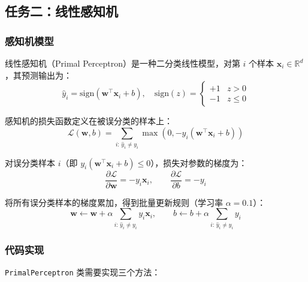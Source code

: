 \documentclass[12pt,a4paper]{ctexart}
\begin{document}
\subsection{任务二：线性感知机}

\subsubsection{感知机模型}

线性感知机（Primal Perceptron）是一种二分类线性模型，对第 $i$ 个样本 $\mathbf{x}_i \in \mathbb{R}^d$，其预测输出为：
\begin{equation}
  \hat{y}_i = \text{sign}(\mathbf{w}^\top \mathbf{x}_i + b), \quad \text{sign}(z) = \begin{cases} +1 & z > 0 \\ -1 & z \leq 0 \end{cases}
  \label{eq:perceptron}
\end{equation}

感知机的损失函数定义在被误分类的样本上：
\begin{equation}
  \mathcal{L}(\mathbf{w}, b) = \sum_{i:\, \hat{y}_i \neq y_i} \max(0, -y_i(\mathbf{w}^\top \mathbf{x}_i + b))
  \label{eq:perceptron_loss}
\end{equation}

对误分类样本 $i$（即 $y_i(\mathbf{w}^\top \mathbf{x}_i + b) \leq 0$），损失对参数的梯度为：
\begin{equation}
  \frac{\partial \mathcal{L}}{\partial \mathbf{w}} = -y_i \mathbf{x}_i, \qquad \frac{\partial \mathcal{L}}{\partial b} = -y_i
  \label{eq:perceptron_grad}
\end{equation}

将所有误分类样本的梯度累加，得到批量更新规则（学习率 $\alpha = 0.1$）：
\begin{equation}
  \mathbf{w} \leftarrow \mathbf{w} + \alpha \sum_{i:\, \hat{y}_i \neq y_i} y_i \mathbf{x}_i, \qquad
  b \leftarrow b + \alpha \sum_{i:\, \hat{y}_i \neq y_i} y_i
  \label{eq:perceptron_update}
\end{equation}

\subsubsection{代码实现}

\texttt{PrimalPerceptron} 类需要实现三个方法：
\end{document}

